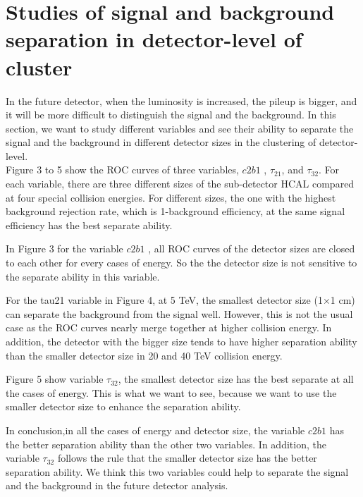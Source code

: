 \section{Studies of signal and background separation in detector-level of cluster}
In the future detector, when the luminosity is increased, the pileup is bigger, and it will be more difficult to distinguish the signal and the background. In this section, we want to study different variables and see their ability to separate the signal and the background in different detector sizes in the clustering of detector-level.\\

Figure 3 to 5 show the ROC curves of three variables, $c2b1$ , $\tau_{21}$, and $\tau_{32}$. For each variable, there are three different sizes of the sub-detector HCAL compared at four special collision energies. For different sizes, the one with the highest background rejection rate, which is 1-background efficiency, at the same signal efficiency has the best separate ability.

In Figure 3 for the variable $c2b1$ , all ROC curves of the detector sizes are closed to each other for every cases of energy. So the the detector size is not sensitive to the separate ability in this variable.

For the tau21 variable in Figure 4, at 5 TeV, the smallest detector size (1$\times$1 cm) can separate the background from the signal well. However, this is not the usual case as the ROC curves nearly merge together at higher collision energy. In addition, the detector with the bigger size tends to have higher separation ability than the smaller detector size in 20 and 40 TeV collision energy. 

Figure 5 show variable $\tau_{32}$, the smallest detector size has the best separate at all the cases of energy. This is what we want to see, because we want to use the smaller detector size to enhance the separation ability.

In conclusion,in all the cases of energy and detector size, the variable $c2b1$ has the better separation ability than the other two variables. In addition, the variable $\tau_{32}$ follows the rule that the smaller detector size has the better separation ability. We think this two variables could help to separate the signal and the background in the future detector analysis.\\
\label{sec:efficiency}


